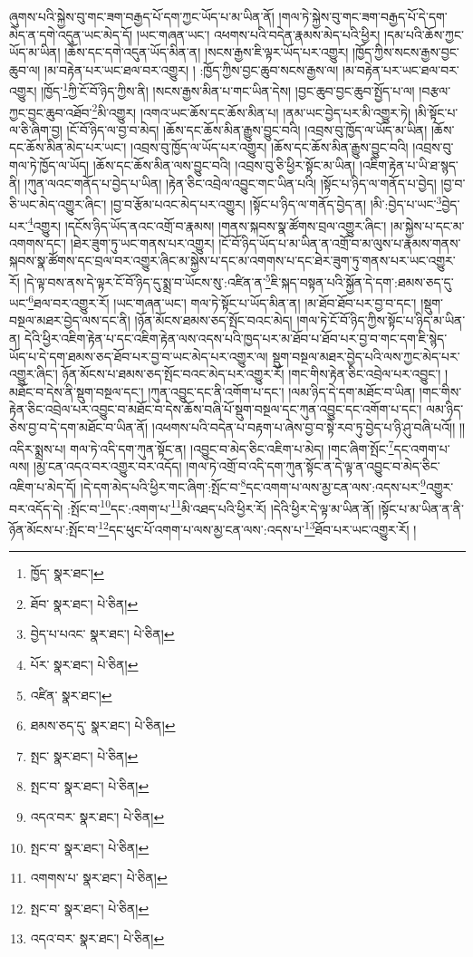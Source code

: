 ཞུགས་པའི་སྐྱེས་བུ་གང་ཟག་བརྒྱད་པོ་དག་ཀྱང་ཡོད་པ་མ་ཡིན་ནོ། །གལ་ཏེ་སྐྱེས་བུ་གང་ཟག་བརྒྱད་པོ་དེ་དག་མེད་ན་དགེ་འདུན་ཡང་མེད་དོ། །ཡང་གཞན་ཡང་། འཕགས་པའི་བདེན་རྣམས་མེད་པའི་ཕྱིར། །དམ་པའི་ཆོས་ཀྱང་ཡོད་མ་ཡིན། །ཆོས་དང་དགེ་འདུན་ཡོད་མིན་ན། །སངས་རྒྱས་ཇི་ལྟར་ཡོད་པར་འགྱུར། །ཁྱོད་ཀྱིས་སངས་རྒྱས་བྱང་ཆུབ་ལ། །མ་བརྟེན་པར་ཡང་ཐལ་བར་འགྱུར། །
:ཁྱོད་ཀྱིས་བྱང་ཆུབ་སངས་རྒྱས་ལ། །མ་བརྟེན་པར་ཡང་ཐལ་བར་འགྱུར། །ཁྱོད་\footnote{ཁྱོད་  སྣར་ཐང་། }ཀྱི་ངོ་བོ་ཉིད་ཀྱིས་ནི། །སངས་རྒྱས་མིན་པ་གང་ཡིན་དེས། །བྱང་ཆུབ་བྱང་ཆུབ་སྤྱོད་པ་ལ། །བརྩལ་ཀྱང་བྱང་ཆུབ་འཐོབ་\footnote{ཐོབ་  སྣར་ཐང་།  པེ་ཅིན། }མི་འགྱུར། །འགའ་ཡང་ཆོས་དང་ཆོས་མིན་པ། །ནམ་ཡང་བྱེད་པར་མི་འགྱུར་ཏེ། །མི་སྟོང་པ་ལ་ཅི་ཞིག་བྱ། །ངོ་བོ་ཉིད་ལ་བྱ་བ་མེད། །ཆོས་དང་ཆོས་མིན་རྒྱུས་བྱུང་བའི། །འབྲས་བུ་ཁྱོད་ལ་ཡོད་མ་ཡིན། །ཆོས་དང་ཆོས་མིན་མེད་པར་ཡང་། །འབྲས་བུ་ཁྱོད་ལ་ཡོད་པར་འགྱུར། །ཆོས་དང་ཆོས་མིན་རྒྱུས་བྱུང་བའི། །འབྲས་བུ་གལ་ཏེ་ཁྱོད་ལ་ཡོད། །ཆོས་དང་ཆོས་མིན་ལས་བྱུང་བའི། །འབྲས་བུ་ཅི་ཕྱིར་སྟོང་མ་ཡིན། །འཇིག་རྟེན་པ་ཡི་ཐ་སྙད་ནི། །ཀུན་ལའང་གནོད་པ་བྱེད་པ་ཡིན། །རྟེན་ཅིང་འབྲེལ་འབྱུང་གང་ཡིན་པའི། །སྟོང་པ་ཉིད་ལ་གནོད་པ་བྱེད། །བྱ་བ་ཅི་ཡང་མེད་འགྱུར་ཞིང་། །བྱ་བ་རྩོམ་པའང་མེད་པར་འགྱུར། །སྟོང་པ་ཉིད་ལ་གནོད་བྱེད་ན། །མི་:བྱེད་པ་ཡང་\footnote{བྱེད་པ་པའང་  སྣར་ཐང་།  པེ་ཅིན། }བྱེད་པར་\footnote{པོར་  སྣར་ཐང་།  པེ་ཅིན། }འགྱུར། །དངོས་ཉིད་ཡོད་ནའང་འགྲོ་བ་རྣམས། །གནས་སྐབས་སྣ་ཚོགས་བྲལ་འགྱུར་ཞིང་། །མ་སྐྱེས་པ་དང་མ་འགགས་དང་། །ཐེར་ཟུག་ཏུ་ཡང་གནས་པར་འགྱུར། །ངོ་བོ་ཉིད་ཡོད་པ་མ་ཡིན་ན་འགྲོ་བ་མ་ལུས་པ་རྣམས་གནས་སྐབས་སྣ་ཚོགས་དང་བྲལ་བར་འགྱུར་ཞིང་མ་སྐྱེས་པ་དང་མ་འགགས་པ་དང་ཐེར་ཟུག་ཏུ་གནས་པར་ཡང་འགྱུར་རོ། །དེ་ལྟ་བས་ནས་དེ་ལྟར་ངོ་བོ་ཉིད་དུ་སྨྲ་བ་ཡོངས་སུ་:འཛིན་ན་\footnote{འཛིན་  སྣར་ཐང་། }ཇི་སྐད་བསྟན་པའི་སྐྱོན་དེ་དག་:ཐམས་ཅད་དུ་ཡང་\footnote{ཐམས་ཅད་དུ་  སྣར་ཐང་།  པེ་ཅིན། }ཐལ་བར་འགྱུར་རོ། །ཡང་གཞན་ཡང་། གལ་ཏེ་སྟོང་པ་ཡོད་མིན་ན། །མ་ཐོབ་ཐོབ་པར་བྱ་བ་དང་། །སྡུག་བསྔལ་མཐར་བྱེད་ལས་དང་ནི། །ཉོན་མོངས་ཐམས་ཅད་སྤོང་བའང་མེད། །གལ་ཏེ་ངོ་བོ་ཉིད་ཀྱིས་སྟོང་པ་ཉིད་མ་ཡིན་ན། དེའི་ཕྱིར་འཇིག་རྟེན་པ་དང་འཇིག་རྟེན་ལས་འདས་པའི་ཁྱད་པར་མ་ཐོབ་པ་ཐོབ་པར་བྱ་བ་གང་དག་ཇི་སྙེད་ཡོད་པ་དེ་དག་ཐམས་ཅད་ཐོབ་པར་བྱ་བ་ཡང་མེད་པར་འགྱུར་ལ། སྡུག་བསྔལ་མཐར་བྱེད་པའི་ལས་ཀྱང་མེད་པར་འགྱུར་ཞིང་། ཉོན་མོངས་པ་ཐམས་ཅད་སྤོང་བའང་མེད་པར་འགྱུར་རོ། །གང་གིས་རྟེན་ཅིང་འབྲེལ་པར་འབྱུང་། །མཐོང་བ་དེས་ནི་སྡུག་བསྔལ་དང་། །ཀུན་འབྱུང་དང་ནི་འགོག་པ་དང་། །ལམ་ཉིད་དེ་དག་མཐོང་བ་ཡིན། །གང་གིས་རྟེན་ཅིང་འབྲེལ་པར་འབྱུང་བ་མཐོང་བ་དེས་ཆོས་བཞི་པོ་སྡུག་བསྔལ་དང་ཀུན་འབྱུང་དང་འགོག་པ་དང་། ལམ་ཉིད་ཅེས་བྱ་བ་དེ་དག་མཐོང་བ་ཡིན་ནོ། །འཕགས་པའི་བདེན་པ་བརྟག་པ་ཞེས་བྱ་བ་སྟེ་རབ་ཏུ་བྱེད་པ་ཉི་ཤུ་བཞི་པའོ།། །།འདིར་སྨྲས་པ། གལ་ཏེ་འདི་དག་ཀུན་སྟོང་ན། །འབྱུང་བ་མེད་ཅིང་འཇིག་པ་མེད། །གང་ཞིག་སྤོང་\footnote{སྤང་  སྣར་ཐང་།  པེ་ཅིན། }དང་འགག་པ་ལས། །མྱ་ངན་འདའ་བར་འགྱུར་བར་འདོད། །གལ་ཏེ་འགྲོ་བ་འདི་དག་ཀུན་སྟོང་ན་དེ་ལྟ་ན་འབྱུང་བ་མེད་ཅིང་འཇིག་པ་མེད་དོ། །དེ་དག་མེད་པའི་ཕྱིར་གང་ཞིག་:སྤོང་བ་\footnote{སྤང་བ་  སྣར་ཐང་།  པེ་ཅིན། }དང་འགག་པ་ལས་མྱ་ངན་ལས་:འདས་པར་\footnote{འདའ་བར་  སྣར་ཐང་།  པེ་ཅིན། }འགྱུར་བར་འདོད་དེ། :སྤོང་བ་\footnote{སྤང་བ་  སྣར་ཐང་།  པེ་ཅིན། }དང་:འགག་པ་\footnote{འགགས་པ་  སྣར་ཐང་།  པེ་ཅིན། }མི་འཐད་པའི་ཕྱིར་རོ། །དེའི་ཕྱིར་དེ་ལྟ་མ་ཡིན་ནོ། །སྟོང་པ་མ་ཡིན་ན་ནི་ཉོན་མོངས་པ་:སྤོང་བ་\footnote{སྤང་བ་  སྣར་ཐང་།  པེ་ཅིན། }དང་ཕུང་པོ་འགག་པ་ལས་མྱ་ངན་ལས་:འདས་པ་\footnote{འདའ་བར་  སྣར་ཐང་།  པེ་ཅིན། }ཐོབ་པར་ཡང་འགྱུར་རོ། །
